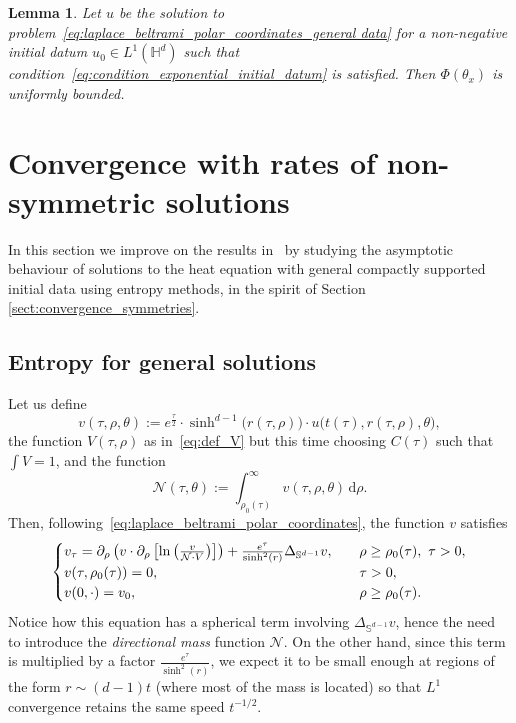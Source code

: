 \documentclass[12pt,longbibliography]{article}
\def\d{\,\mathrm{d}}
\def\d{\,\mathrm{d}}
\def\H{\mathbb{H}}
\newtheorem{lem}[thm]{Lemma}
\theoremstyle{definition}
\theoremstyle{remark}
\theoremstyle{example}
\begin{document}
\begin{lem}\label{lem:boundedness_of_Phi}
Let $u$ be the solution to problem~\eqref{eq:laplace_beltrami_polar_coordinates_general data} for a non-negative initial datum $u_0\in L^1(\H^d)$ such that condition~\eqref{eq:condition_exponential_initial_datum} is satisfied. Then $\Phi(\theta_x)$ is uniformly bounded.
\end{lem}
\section{Convergence with rates of non-symmetric solutions}\label{sect:convergence_integrable_with_rates}
In this section we improve on the results in~\cite{Papageorgiou2025} by studying the asymptotic behaviour of solutions to the heat equation with general compactly supported initial data using entropy methods, in the spirit of Section \ref{sect:convergence_symmetries}.

\subsection{Entropy for general solutions}

Let us define
\[
v(\tau, \rho, \theta):=e^\frac{\tau}{2}\cdot\sinh^{d-1}\big(r(\tau,\rho)\big)\cdot u\big(t(\tau), r(\tau,\rho), \theta\big),
\]
the function $V(\tau, \rho)$ as in~\eqref{eq:def_V} but this time choosing $C(\tau)$ such that $\int V=1$, and the function
\[
\mathcal{N}(\tau, \theta) := \int_{\rho_0(\tau)}^\infty v(\tau, \rho, \theta) \d \rho.
\]
Then, following~\eqref{eq:laplace_beltrami_polar_coordinates}, the function  $v$ satisfies
\begin{equation}\label{eq:main_spherical_coordinates_general_datum}\notag
	\begin{cases}
		v_\tau = \partial_\rho\left(v\cdot\partial_\rho\left[\ln\left(\frac{v}{\mathcal{N}\cdot V}\right)\right]\right) +\frac{e^\tau}{\sinh^{2}(r)}\Delta_{\mathbb{S}^{d-1}}v ,\quad &\rho\geq \rho_0(\tau),\ \tau>0,\\
		v(\tau, \rho_0(\tau))=0, &\tau>0,\\
		v(0,\cdot) = v_0, &\rho\geq \rho_0(\tau).
	\end{cases}
\end{equation}
Notice how this equation has a spherical term involving $\Delta_{\mathbb{S}^{d-1}}v$, hence the need to introduce the \textit{directional mass} function $\mathcal{N}$. On the other hand, since this term is multiplied by a factor $\frac{e^\tau}{\sinh^{2}(r)}$, we expect it to be small enough at regions of the form $r\sim (d-1)t$ (where most of the mass is located) so that $L^1$ convergence retains the same speed $t^{-1/2}$.
\end{document}
